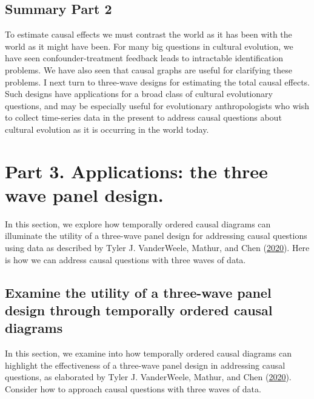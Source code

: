 \documentclass[
  singlecolumn]{report}
\begin{document}
\hypertarget{summary-part-2}{%
\subsection{Summary Part 2}\label{summary-part-2}}

To estimate causal effects we must contrast the world as it has been
with the world as it might have been. For many big questions in cultural
evolution, we have seen confounder-treatment feedback leads to
intractable identification problems. We have also seen that causal
graphs are useful for clarifying these problems. I next turn to
three-wave designs for estimating the total causal effects. Such designs
have applications for a broad class of cultural evolutionary questions,
and may be especially useful for evolutionary anthropologists who wish
to collect time-series data in the present to address causal questions
about cultural evolution as it is occurring in the world today.

\hypertarget{part-3.-applications-the-three-wave-panel-design.}{%
\section{Part 3. Applications: the three wave panel
design.}\label{part-3.-applications-the-three-wave-panel-design.}}

In this section, we explore how temporally ordered causal diagrams can
illuminate the utility of a three-wave panel design for addressing
causal questions using data as described by Tyler J. VanderWeele,
Mathur, and Chen (\protect\hyperlink{ref-vanderweele2020}{2020}). Here
is how we can address causal questions with three waves of data.

\hypertarget{examine-the-utility-of-a-three-wave-panel-design-through-temporally-ordered-causal-diagrams}{%
\subsection{\texorpdfstring{\textbf{Examine the utility of a three-wave
panel design through temporally ordered causal
diagrams}}{Examine the utility of a three-wave panel design through temporally ordered causal diagrams}}\label{examine-the-utility-of-a-three-wave-panel-design-through-temporally-ordered-causal-diagrams}}

In this section, we examine into how temporally ordered causal diagrams
can highlight the effectiveness of a three-wave panel design in
addressing causal questions, as elaborated by Tyler J. VanderWeele,
Mathur, and Chen (\protect\hyperlink{ref-vanderweele2020}{2020}).
Consider how to approach causal questions with three waves of data.
\end{document}
